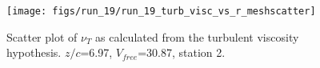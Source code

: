 \begin{figure}[H]
\centering
\texttt{[image: figs/run\_19/run\_19\_turb\_visc\_vs\_r\_meshscatter]}
\caption{Scatter plot of $\nu_T$ as calculated from the turbulent viscosity hypothesis. $z/c$=6.97, $V_{free}$=30.87, station 2.}
\label{fig:run_19_turb_visc_vs_r_meshscatter}
\end{figure}



